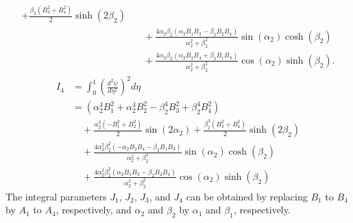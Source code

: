 \documentclass[preprint,12pt]{elsarticle}
\begin{document}
\begin{appendices}
\begin{equation}
\begin{aligned}
		 + \frac{\beta_2 (B_3^2 + B_4^2)}{2} \sinh(2\beta_2) \\
		&\quad + \frac{4 \alpha_2 \beta_2 (\alpha_2 B_1 B_3 - \beta_2 B_2 B_4)}{\alpha_2^2 + \beta_2^2} \sin(\alpha_2) \cosh(\beta_2) \\
		&\quad + \frac{4 \alpha_2 \beta_2 (\alpha_2 B_2 B_4 + \beta_2 B_1 B_3)}{\alpha_2^2 + \beta_2^2} \cos(\alpha_2) \sinh(\beta_2).
	\end{aligned}
\end{equation}
%
\begin{equation}\label{eq:inte_dphi4}
	\begin{split}
		I_4 &= \int_{0}^{1} \left( \frac{d^2 \psi}{d \eta^2} \right)^2 d \eta \\
		&= \left( \alpha_2^4 B_1^2 + \alpha_2^4 B_2^2 - \beta_2^4 B_3^2 + \beta_2^4 B_4^2 \right) \\
		&\quad + \frac{\alpha_2^3 (-B_1^2 + B_2^2)}{2} \sin(2 \alpha_2)
		+ \frac{\beta_2^3 (B_3^2 + B_4^2)}{2} \sinh(2 \beta_2) \\
		&\quad + \frac{4 \alpha_2^2 \beta_2^2 (-\alpha_2 B_2 B_4 - \beta_2 B_1 B_3)}{\alpha_2^2 + \beta_2^2} \sin(\alpha_2) \cosh(\beta_2) \\
		&\quad + \frac{4 \alpha_2^2 \beta_2^2 (\alpha_2 B_1 B_3 - \beta_2 B_2 B_4)}{\alpha_2^2 + \beta_2^2} \cos(\alpha_2) \sinh(\beta_2)
	\end{split}
\end{equation}
%
The integral parameters \( J_1 \), \( J_2 \), \( J_3 \), and \( J_4 \) can be obtained by replacing \( B_1 \) to \( B_4 \) by \( A_1 \) to \( A_4 \), respectively, and \( \alpha_2 \) and \( \beta_2 \) by \( \alpha_1 \) and \( \beta_1 \), respectively.

\end{appendices}
\FloatBarrier


	
\end{document}
